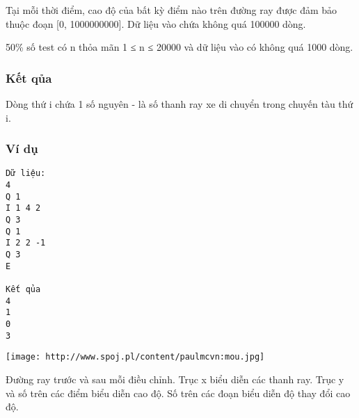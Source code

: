    Tại mỗi thời điểm, cao độ của bất kỳ điểm nào trên đường ray được đảm bảo thuộc đoạn [0, 1000000000]. Dữ liệu   vào chứa không quá 100000 dòng.  

   50\% số test có n thỏa mãn 1 ≤ n ≤ 20000 và dữ liệu vào có không quá 1000 dòng.  

\subsubsection{   Kết qủa  }

   Dòng thứ i chứa 1 số nguyên - là số thanh ray xe di chuyển trong chuyến tàu thứ i.  

\subsubsection{   Ví dụ  }
\begin{verbatim}
Dữ liệu:
4
Q 1
I 1 4 2
Q 3
Q 1
I 2 2 -1
Q 3
E

Kết qủa
4
1
0
3
\end{verbatim}


\texttt{[image: http://www.spoj.pl/content/paulmcvn:mou.jpg]}

   Đường ray trước và sau mỗi điều chỉnh. Trục x biểu diễn các thanh ray. Trục y và số trên các điểm biểu diễn cao độ.   Số trên các đoạn biểu diễn độ thay đổi cao độ.  